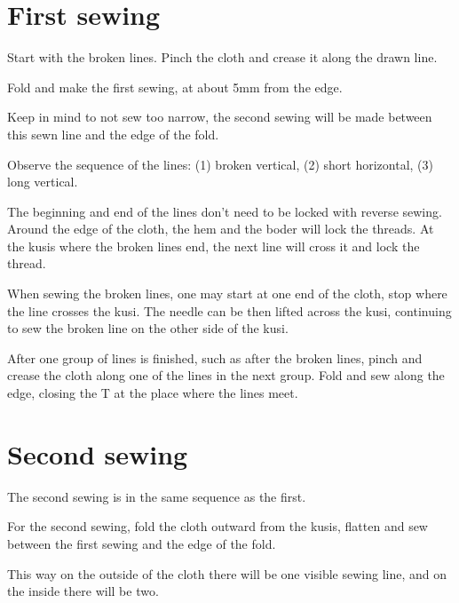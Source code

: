 \section{First sewing}

Start with the broken lines. Pinch the cloth and crease it along the
drawn line.

Fold and make the first sewing, at about 5mm from the edge.

Keep in mind to not sew too narrow, the second sewing will be made
between this sewn line and the edge of the fold.

Observe the sequence of the lines: (1) broken vertical, (2) short
horizontal, (3) long vertical.



The beginning and end of the lines don't need to be locked with reverse
sewing. Around the edge of the cloth, the hem and the boder will lock
the threads. At the kusis where the broken lines end, the next line will
cross it and lock the thread.

When sewing the broken lines, one may start at one end of the cloth,
stop where the line crosses the kusi. The needle can be then lifted
across the kusi, continuing to sew the broken line on the other side of
the kusi.

After one group of lines is finished, such as after the broken lines,
pinch and crease the cloth along one of the lines in the next group.
Fold and sew along the edge, closing the T at the place where the lines
meet.

\section{Second sewing}

The second sewing is in the same sequence as the first.

For the second sewing, fold the cloth outward from the kusis, flatten
and sew between the first sewing and the edge of the fold.



This way on the outside of the cloth there will be one visible sewing
line, and on the inside there will be two.

